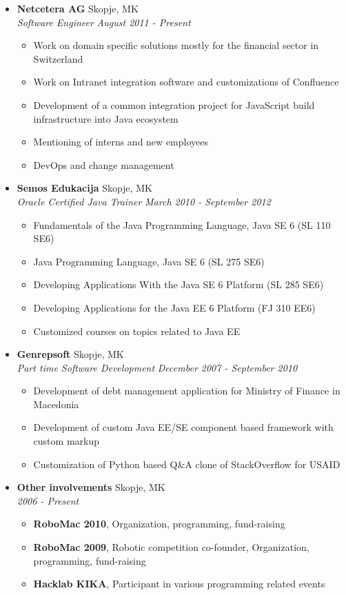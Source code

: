 \documentclass[letterpaper,11pt]{article}
\newcommand{\resitem}[1]{\item #1 \vspace{-2pt}}
\newcommand{\ressubheading}[4]{
  \textbf{#1}  #2\\
  \textit{#3} \textit{#4}\\
}
\begin{document}
\begin{itemize}

\item []  
\ressubheading{Netcetera AG}{Skopje, MK}{Software Engineer}{August 2011 - Present}
	\begin{itemize}
      \resitem{ Work on domain specific solutions mostly for the financial sector in Switzerland}
      \resitem{ Work on Intranet integration software and customizations of Confluence}     
      \resitem{ Development of a common integration project for JavaScript build infrastructure into Java ecosystem}
      \resitem{ Mentioning of interns and new employees }
      \resitem{ DevOps and change management}
	\end{itemize}

\item []

	\ressubheading{Semos Edukacija }{Skopje, MK}{ Oracle Certified Java Trainer }{March 2010 - September 2012}

	\begin{itemize}
 
      \resitem{Fundamentals of the Java Programming Language, Java SE 6 (SL 110 SE6) }
      \resitem{Java Programming Language, Java SE 6 (SL 275 SE6) }
      \resitem{Developing Applications With the Java SE 6 Platform (SL 285 SE6)}
      \resitem{Developing Applications for the Java EE 6 Platform (FJ 310 EE6)}
      \resitem{Customized courses on topics related to Java EE}

	\end{itemize}

\item []

	\ressubheading{Genrepsoft}{Skopje, MK}{Part time Software Development}{December 2007 - September 2010}

	\begin{itemize}
      
      \resitem{Development of debt management application for Ministry of Finance in Macedonia}
      \resitem{Development of custom Java EE/SE component based framework with custom markup}
      \resitem{Customization of Python based Q\&A clone of StackOverflow for USAID  }
    
	\end{itemize}
 
\item []

	\ressubheading{Other involvements}{Skopje, MK}{ }{2006 - Present}

	\begin{itemize}
	  
	  \resitem{{\bf RoboMac 2010}, Organization, programming, fund-raising }
	  \resitem{{\bf RoboMac 2009}, Robotic competition co-founder, Organization, programming, fund-raising }
	  \resitem{{\bf Hacklab KIKA}, Participant in various programming related events}
 
	\end{itemize}
	
\end{itemize}
\end{document}
